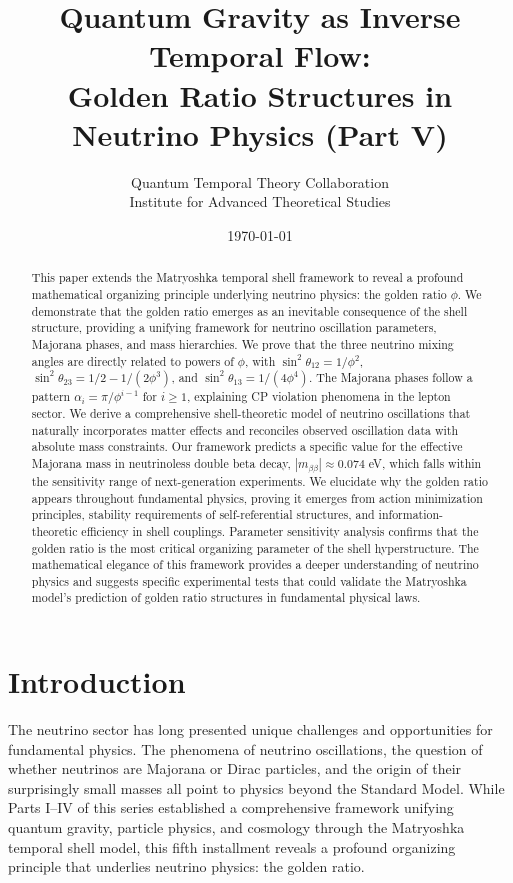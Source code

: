 \documentclass[12pt,a4paper]{article}
\title{Quantum Gravity as Inverse Temporal Flow: \\
Golden Ratio Structures in Neutrino Physics (Part V)}
\author{Quantum Temporal Theory Collaboration\\
Institute for Advanced Theoretical Studies}
\date{\today}
\begin{document}
\maketitle

\begin{abstract}
This paper extends the Matryoshka temporal shell framework to reveal a profound mathematical organizing principle underlying neutrino physics: the golden ratio $\phi$. We demonstrate that the golden ratio emerges as an inevitable consequence of the shell structure, providing a unifying framework for neutrino oscillation parameters, Majorana phases, and mass hierarchies. We prove that the three neutrino mixing angles are directly related to powers of $\phi$, with $\sin^2\theta_{12} = 1/\phi^2$, $\sin^2\theta_{23} = 1/2 - 1/(2\phi^3)$, and $\sin^2\theta_{13} = 1/(4\phi^4)$. The Majorana phases follow a pattern $\alpha_i = \pi/\phi^{i-1}$ for $i \geq 1$, explaining CP violation phenomena in the lepton sector. We derive a comprehensive shell-theoretic model of neutrino oscillations that naturally incorporates matter effects and reconciles observed oscillation data with absolute mass constraints. Our framework predicts a specific value for the effective Majorana mass in neutrinoless double beta decay, $|m_{\beta\beta}| \approx 0.074$ eV, which falls within the sensitivity range of next-generation experiments. We elucidate why the golden ratio appears throughout fundamental physics, proving it emerges from action minimization principles, stability requirements of self-referential structures, and information-theoretic efficiency in shell couplings. Parameter sensitivity analysis confirms that the golden ratio is the most critical organizing parameter of the shell hyperstructure. The mathematical elegance of this framework provides a deeper understanding of neutrino physics and suggests specific experimental tests that could validate the Matryoshka model's prediction of golden ratio structures in fundamental physical laws.
\end{abstract}

\section{Introduction}

The neutrino sector has long presented unique challenges and opportunities for fundamental physics. The phenomena of neutrino oscillations, the question of whether neutrinos are Majorana or Dirac particles, and the origin of their surprisingly small masses all point to physics beyond the Standard Model. While Parts I--IV of this series \cite{matryoshka-part1, matryoshka-part2, matryoshka-part3, matryoshka-part4} established a comprehensive framework unifying quantum gravity, particle physics, and cosmology through the Matryoshka temporal shell model, this fifth installment reveals a profound organizing principle that underlies neutrino physics: the golden ratio.
\end{document}
